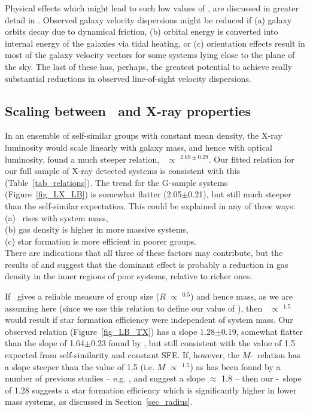 \documentclass[usenatbib]{mn2e}
\begin{document}
Physical effects which might lead to such low values of \sigmav, are discussed in
greater detail in \citet{helsdon04}.  Observed galaxy velocity dispersions might
be reduced if (a) galaxy orbits decay due to dynamical friction, (b) orbital
energy is converted into internal energy of the galaxies via tidal heating, or
(c) orientation effects result in most of the galaxy velocity vectors for some
systems lying close to the plane of the sky.  The last of these has, perhaps, the
greatest potential to achieve really substantial reductions in observed
line-of-sight velocity dispersions.


\subsection{Scaling between \LB\ and X-ray properties}

In an ensemble of self-similar groups with constant mean density, the X-ray
luminosity would scale linearly with galaxy mass, and hence with optical
luminosity.  \citet{helsdon03b} found a much steeper relation, \LX\ $\propto$
\LB$^{2.69\pm0.29}$. Our fitted relation for our full sample of X-ray detected
systems is consistent with this (Table~\ref{tab_relations}).  The trend for the
G-sample systems (Figure~\ref{fig_LX_LB}) is somewhat flatter (2.05$\pm$0.21),
but still much steeper than the self-similar expectation.  This could be
explained in any of three ways:\\

\noindent (a) \fgas\ rises with system mass,\\
(b) gas density is higher in more massive systems,\\
(c) star formation is more efficient in poorer groups.\\

\noindent There are indications that all three of these factors may contribute,
but the results of \citet{ponman99} and \citet{sanderson03a} suggest that the
dominant effect is probably a reduction in gas density in the inner regions of
poor systems, relative to richer ones.

If \TX\ gives a reliable measure of group size ($R$ $\propto$ \TX$^{0.5}$) and
hence mass, as we are assuming here (since we use this relation to define our
value of \rfh), then \LB\ $\propto$ \TX$^{1.5}$ would result if star formation
efficiency were independent of system mass.  Our observed relation
(Figure~\ref{fig_LB_TX}) has a slope 1.28$\pm$0.19, somewhat flatter than the
slope of 1.64$\pm$0.23 found by \citet{helsdon03b}, but still consistent with the
value of 1.5 expected from self-similarity and constant SFE.  If, however, the
$M$-\TX\ relation has a slope steeper than the value of 1.5 (i.e. $M$ $\propto$
\TX$^{1.5}$) as has been found by a number of previous studies -- e.g. 
\citet{nevalainen00a}, \citet{finoguenov01b} and \citet{sanderson03a} suggest a
slope $\approx$ 1.8 -- then our \LB-\TX\ slope of 1.28 suggests a star formation
efficiency which is significantly higher in lower mass systems, as discussed in
Section~\ref{sec_radius}.
\end{document}

